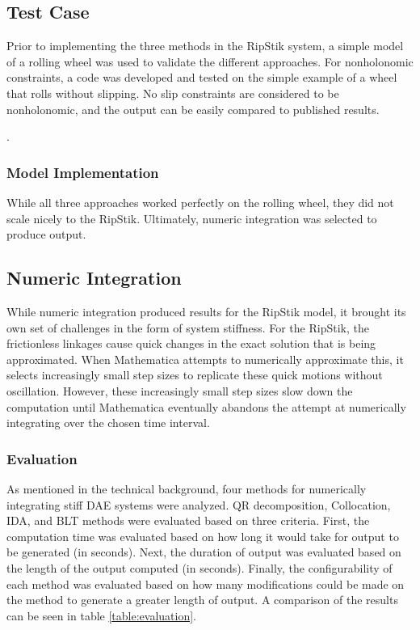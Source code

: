 \documentclass[12pt,letterpaper]{article}
\begin{document}
\subsection{Test Case}
Prior to implementing the three methods in the RipStik system, a simple model of a rolling wheel was used to validate the different approaches. For nonholonomic constraints, a code was developed and tested on the simple example of a wheel that rolls without slipping.
No slip constraints are considered to be nonholonomic, and the output can be easily compared to published results.
\par
[FIGURE OUT HOW WE WANT TO SHOW OUTPUT FROM THE ROLLING WHEEL EXAMPLE HERE].
\par
\subsubsection{Model Implementation}
While all three approaches worked perfectly on the rolling wheel, they did not scale nicely to the RipStik.
Ultimately, numeric integration was selected to produce output.

\subsection{Numeric Integration}
While numeric integration produced results for the RipStik model, it brought its own set of challenges in the form of system stiffness.
For the RipStik, the frictionless linkages cause quick changes in the exact solution that is being approximated. 
When Mathematica attempts to numerically approximate this, it selects increasingly small step sizes to replicate these quick motions without oscillation. 
However, these increasingly small step sizes slow down the computation until Mathematica eventually abandons the attempt at numerically integrating over the chosen time interval.


\subsubsection{Evaluation}
As mentioned in the technical background, four methods for numerically integrating stiff DAE systems were analyzed. 
QR decomposition, Collocation, IDA, and BLT methods were evaluated based on three criteria.
First, the computation time was evaluated based on how long it would take for output to be generated (in seconds).
Next, the duration of output was evaluated based on the length of the output computed (in seconds).
Finally, the configurability of each method was evaluated based on how many modifications could be made on the method to generate a greater length of output.
A comparison of the results can be seen in table \ref{table:evaluation}.
\end{document}
